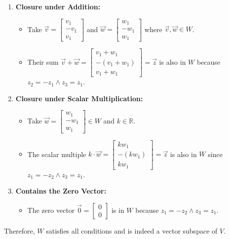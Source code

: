 \begin{enumerate}
    \item \textbf{Closure under Addition:}
     \begin{itemize}
            \item Take \(\vec{v} =\begin{bmatrix} v_1 \\ -v_1 \\ v_1 \end{bmatrix}\) and \(\vec{w} =\begin{bmatrix} w_1 \\ -w_1 \\ w_1 \end{bmatrix}\) where \(\vec v, \vec w \in W \).
            \item Their sum \(\vec{v} + \vec{w} =\begin{bmatrix} v_1 + w_1 \\ -(v_1 + w_1) \\ v_1 + w_1 \end{bmatrix} = \vec z\) is also in \(W\) because \(z_2 = -z_1 \land z_3 = z_1\).
        \end{itemize}
        
    \item \textbf{Closure under Scalar Multiplication:}
     \begin{itemize}
            \item Take \(\vec{w} =\begin{bmatrix} w_1 \\ -w_1 \\ w_1 \end{bmatrix} \in W\) and \(k \in \mathbb{R}\).
            \item The scalar multiple \(k \cdot \vec{w} =\begin{bmatrix} kw_1 \\ -(kw_1) \\ kw_1 \end{bmatrix} = \vec z\) is also in \(W\) since \(z_1 = -z_2 \land z_3 = z_1\).
        \end{itemize}
    
    \item \textbf{Contains the Zero Vector:}
     \begin{itemize}
            \item The zero vector \(\vec{0} =\begin{bmatrix} 0 \\ 0 \end{bmatrix}\) is in \(W\) because \(z_1 = -z_2 \land z_3 = z_1\).
        \end{itemize}
\end{enumerate}
Therefore, \(W\) satisfies all conditions and is indeed a vector subspace of \(V\).
\\

